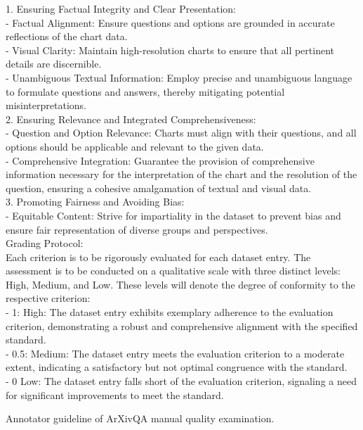 \begin{table*}[t!]
    \centering
    \tiny  
    \begin{tcolorbox}
1. Ensuring Factual Integrity and Clear Presentation:\\
- Factual Alignment: Ensure questions and options are grounded in accurate reflections of the chart data.\\
- Visual Clarity: Maintain high-resolution charts to ensure that all pertinent details are discernible.\\
- Unambiguous Textual Information: Employ precise and unambiguous language to formulate questions and answers, thereby mitigating potential misinterpretations.\\
2. Ensuring Relevance and Integrated Comprehensiveness:\\
- Question and Option Relevance: Charts must align with their questions, and all options should be applicable and relevant to the given data.\\
- Comprehensive Integration: Guarantee the provision of comprehensive information necessary for the interpretation of the chart and the resolution of the question, ensuring a cohesive amalgamation of textual and visual data.\\ 
3. Promoting Fairness and Avoiding Bias:\\
- Equitable Content: Strive for impartiality in the dataset to prevent bias and ensure fair representation of diverse groups and perspectives.\\

Grading Protocol:\\
Each criterion is to be rigorously evaluated for each dataset entry. The assessment is to be conducted on a qualitative scale with three distinct levels: High, Medium, and Low. These levels will denote the degree of conformity to the respective criterion:\\
- 1: High: The dataset entry exhibits exemplary adherence to the evaluation criterion, demonstrating a robust and comprehensive alignment with the specified standard.\\
- 0.5: Medium: The dataset entry meets the evaluation criterion to a moderate extent, indicating a satisfactory but not optimal congruence with the standard.\\
- 0 Low: The dataset entry falls short of the evaluation criterion, signaling a need for significant improvements to meet the standard.
    \end{tcolorbox}
    \caption{Annotator guideline of ArXivQA manual quality examination.}
    \label{tab:quality_analysis_ArXivqa}
\end{table*}

